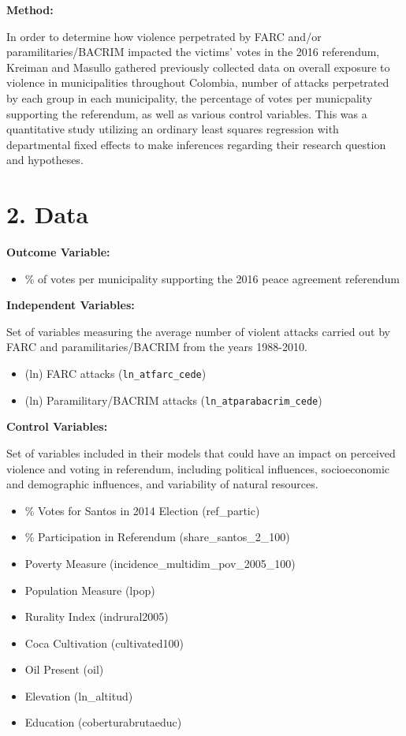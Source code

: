 \documentclass[12pt,letterpaper]{article}
\begin{document}
	\textbf{Method:}
	
	In order to determine how violence perpetrated by FARC and/or paramilitaries/BACRIM impacted the victims' votes in the 2016 referendum, Kreiman and Masullo gathered previously collected data on overall exposure to violence in municipalities throughout Colombia, number of attacks perpetrated by each group in each municipality, the percentage of votes per municpality supporting the referendum, as well as various control variables. This was a quantitative study utilizing an ordinary least squares regression with departmental fixed effects to make inferences regarding their research question and hypotheses. 
	
	\vspace{.8cm}

	\section*{2. Data}
	
	
	
	\textbf{Outcome Variable:}
	\begin{itemize}
		\item \% of votes per municipality supporting the 2016 peace agreement referendum
	\end{itemize}
	
	\textbf{Independent Variables:}
	
	\noindent Set of variables measuring the average number of violent attacks carried out by FARC and paramilitaries/BACRIM from the years 1988-2010.
	\begin{itemize}
		\item (ln) FARC attacks (\texttt{ln\_atfarc\_cede})
		\item (ln) Paramilitary/BACRIM attacks (\texttt{ln\_atparabacrim\_cede})
	\end{itemize}
	
	\textbf{Control Variables:}
	
	\noindent Set of variables included in their models that could have an impact on perceived violence and voting in referendum, including political influences, socioeconomic and demographic influences, and variability of natural resources.
	\begin{itemize}
		\item \% Votes for Santos in 2014 Election (ref\_partic)
		\item \% Participation in Referendum (share\_santos\_2\_100)
		\item Poverty Measure (incidence\_multidim\_pov\_2005\_100)
		\item Population Measure (lpop)
		\item Rurality Index (indrural2005)
		\item Coca Cultivation (cultivated100)
		\item Oil Present (oil)
		\item Elevation (ln\_altitud)
		\item Education (coberturabrutaeduc)
	\end{itemize}
	
\end{document}
